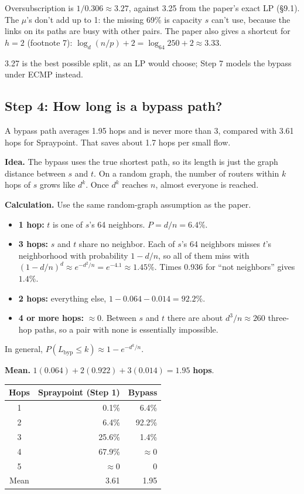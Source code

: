 Oversubscription is $1 / 0.306 \approx \mathbf{3.27}$, against 3.25 from the paper's exact LP (§9.1). The $\mu$'s don't add up to 1: the missing 69\% is capacity $s$ can't use, because the links on its paths are busy with other pairs. The paper also gives a shortcut for $h = 2$ (footnote 7): $\log_d(n/p) + 2 = \log_{64} 250 + 2 \approx 3.33$.

3.27 is the best possible split, as an LP would choose; Step 7 models the bypass under ECMP instead.

\subsection{Step 4: How long is a bypass path?}

A bypass path averages 1.95 hops and is never more than 3, compared with 3.61 hops for Spraypoint. That saves about 1.7 hops per small flow.

\textbf{Idea.} The bypass uses the true shortest path, so its length is just the graph distance between $s$ and $t$. On a random graph, the number of routers within $k$ hops of $s$ grows like $d^k$. Once $d^k$ reaches $n$, almost everyone is reached.

\textbf{Calculation.} Use the same random-graph assumption as the paper.
\begin{itemize}
  \item \textbf{1 hop:} $t$ is one of $s$'s 64 neighbors. $P = d/n = 6.4\%$.
  \item \textbf{3 hops:} $s$ and $t$ share no neighbor. Each of $s$'s 64 neighbors misses $t$'s neighborhood with probability $1 - d/n$, so all of them miss with $(1 - d/n)^d \approx e^{-d^2/n} = e^{-4.1} \approx 1.45\%$. Times 0.936 for ``not neighbors'' gives $1.4\%$.
  \item \textbf{2 hops:} everything else, $1 - 0.064 - 0.014 = 92.2\%$.
  \item \textbf{4 or more hops:} $\approx 0$. Between $s$ and $t$ there are about $d^3/n \approx 260$ three-hop paths, so a pair with none is essentially impossible.
\end{itemize}

In general, $P(L_{\text{byp}} \le k) \approx 1 - e^{-d^k / n}$.

\textbf{Mean.} $1(0.064) + 2(0.922) + 3(0.014) = \mathbf{1.95}$ \textbf{hops}.

\begin{center}
\begin{tabular}{@{}crr@{}}
\toprule
Hops & Spraypoint (Step 1) & Bypass \\
\midrule
1 & 0.1\% & 6.4\% \\
2 & 6.4\% & 92.2\% \\
3 & 25.6\% & 1.4\% \\
4 & 67.9\% & $\approx 0$ \\
5 & $\approx 0$ & 0 \\
\midrule
Mean & 3.61 & 1.95 \\
\bottomrule
\end{tabular}
\end{center}

